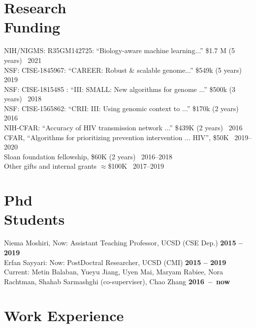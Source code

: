 \documentclass[margin,line,letterpaper]{resume}
\begin{document}
\begin{resume}
    \section{\mysidestyle Research\\Funding}
          NIH/NIGMS: R35GM142725:  ``Biology-aware machine learning...''
 \$1.7 M (5 years)~
  \hfill 2021\\
      NSF: CISE-1845967:  ``CAREER: Robust \& scalable genome...''
 \$549k (5 years)~
 \hfill 2019\\
      NSF: CISE-1815485 :  ``III: SMALL: New algorithms for genome ...''
 \$500k (3 years)~
 \hfill 2018\\
 NSF: CISE-1565862:  ``CRII: III: Using genomic context to ...''
 \$170k (2 years)~
 \hfill 2016\\
 NIH-CFAR:  ``Accuracy of HIV transmission network ...''
 \$439K (2 years)~
 \hfill 2016\\
 CFAR, ``Algorithms for prioritizing prevention intervention ... HIV'', \$50K \hfill  ~2019--2020\\
  Sloan foundation fellowship, \$60K (2 years) \hfill  ~2016--2018\\
 Other gifts and internal grants $\approx$\$100K  \hfill  ~2017--2019



\section{\mysidestyle Phd \\Students}
    Niema Moshiri, Now: Assistant Teaching Professor, UCSD (CSE Dep.)
 \hfill \textbf{2015 -- 2019}\\
     Erfan Sayyari:  Now: PostDoctral Researcher, UCSD (CMI)
 \hfill \textbf{2015 -- 2019}\\
Current: Metin Balaban, Yueyu Jiang, Uyen Mai, Maryam Rabiee, Nora Rachtman, Shahab Sarmashghi (co-superviser), Chao Zhang \hfill \textbf{2016~--~now}



    \section{\mysidestyle Work Experience}


\end{resume}
\end{document}
